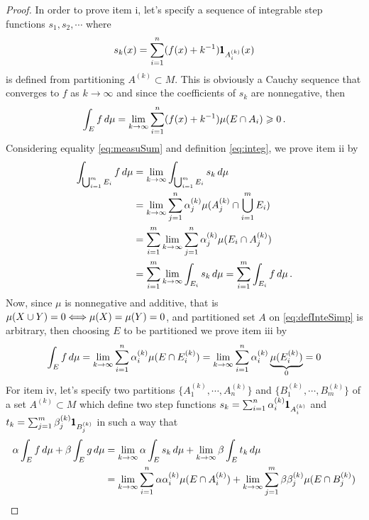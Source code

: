 \begin{proof}
{\footnotesize
In order to prove item i, let's specify a sequence of integrable step functions $s_1,s_2,\cdots$ where
\begin{equation*}
s_k(x)=\sum_{{i}=1}^n(f(x)+k^{-1})\pmb{1}_{A_i^{(k)}}(x)
\end{equation*}
is defined from partitioning $A^{(k)}\subset M$. This is obviously a Cauchy sequence that converges to $f$ as $k\to\infty$ and since the coefficients of $s_k$ are nonnegative, then
\begin{equation*}
\int_E f\,d\mu=\lim_{k\to \infty}\sum_{i=1}^n(f(x)+k^{-1})\mu(E\cap A_i)\geqslant 0\,.
\end{equation*}
Considering equality \eqref{eq:measuSum} and definition \eqref{eq:integ}, we prove item ii by
\begin{align*}
\int_{\bigcup_{i=1}^mE_i}f\,d\mu &= \lim_{k\to \infty}\int_{\bigcup_{i=1}^mE_i} s_k\,d\mu\\
&=\lim_{k\to \infty} \sum_{j=1}^n\alpha_{j}^{(k)}\mu(A_j^{(k)}\cap\bigcup_{i=1}^m E_i)\\
&=\sum_{i=1}^m\lim_{k\to \infty} \sum_{j=1}^n\alpha_{j}^{(k)}\mu( E_i\cap A_j^{(k)})\\
&=\sum_{i=1}^m\lim_{k\to \infty} \int_{E_i} s_k \,d\mu= \sum_{i=1}^m \int_{E_i} f\,d\mu\,.
\end{align*}
Now, since $\mu$ is nonnegative and additive, that is $\mu(X\cup Y)=0\Longleftrightarrow\mu(X)=\mu(Y)=0$, and partitioned set $A$ on \eqref{eq:defInteSimp} is arbitrary, then choosing $E$ to be partitioned we prove item iii by
\begin{equation*}
\int_E f\,d\mu = \lim_{k\to \infty} \sum_{i=1}^n\alpha_{i}^{(k)}\mu( E\cap E_i^{(k)}) = \lim_{k\to \infty} \sum_{i=1}^n\alpha_{i}^{(k)}\underbrace{\mu(E_i^{(k)})}_{0} = 0
\end{equation*}
For item iv, let's specify two partitions $\{A_1^{(k)},\cdots,A_n^{(k)}\}$ and $\{B_1^{(k)},\cdots,B_m^{(k)}\}$ of a set $A^{(k)}\subset M$ which define two step functions $s_k=\sum_{{i}=1}^n\alpha^{(k)}_i\pmb{1}_{A_i^{(k)}}$ and $t_k=\sum_{{j}=1}^m\beta^{(k)}_j\pmb{1}_{B_j^{(k)}}$ in such a way that
\begin{align*}
\alpha\int_{E}f\,d\mu+\beta\int_{E}g\,d\mu&=\lim_{k\to\infty}\alpha\int_{E}s_k\,d\mu + \lim_{k\to\infty}\beta\int_{E}t_k\,d\mu\\
&=\lim_{k\to\infty}\sum_{i=1}^n\alpha\alpha_i^{(k)}\fua{\mu}{E\cap A_i^{(k)}}+\lim_{k\to\infty}\sum_{j=1}^m\beta\beta_j^{(k)}\fua{\mu}{E\cap B_j^{(k)}}\\

\end{align*}}
\end{proof}
